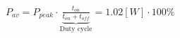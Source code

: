 \documentclass[preview]{standalone}
\begin{document}
\begin{center}
$P_{av} = P_{peak} \cdot \underbrace{\frac{t_{on}}{t_{on}+t_{off}}}_{\text{Duty cycle}}=$$1.02 [W] \cdot 100 \%$
\end{center}
\end{document}
